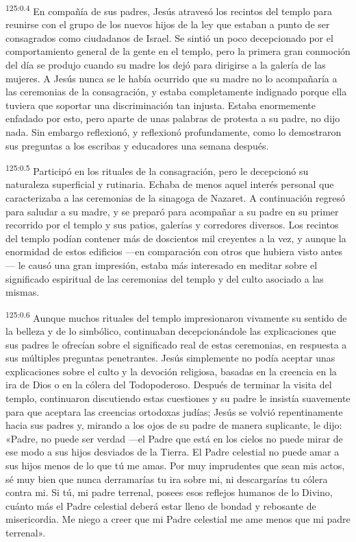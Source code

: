 \par
\textsuperscript{125:0.4} En compañía de sus padres, Jesús atravesó los recintos del templo para reunirse con el grupo de los nuevos hijos de la ley que estaban a punto de ser consagrados como ciudadanos de Israel. Se sintió un poco decepcionado por el comportamiento general de la gente en el templo, pero la primera gran conmoción del día se produjo cuando su madre los dejó para dirigirse a la galería de las mujeres. A Jesús nunca se le había ocurrido que su madre no lo acompañaría a las ceremonias de la consagración, y estaba completamente indignado porque ella tuviera que soportar una discriminación tan injusta. Estaba enormemente enfadado por esto, pero aparte de unas palabras de protesta a su padre, no dijo nada. Sin embargo reflexionó, y reflexionó profundamente, como lo demostraron sus preguntas a los escribas y educadores una semana después.

\par
\textsuperscript{125:0.5} Participó en los rituales de la consagración, pero le decepcionó su naturaleza superficial y rutinaria. Echaba de menos aquel interés personal que caracterizaba a las ceremonias de la sinagoga de Nazaret. A continuación regresó para saludar a su madre, y se preparó para acompañar a su padre en su primer recorrido por el templo y sus patios, galerías y corredores diversos. Los recintos del templo podían contener más de doscientos mil creyentes a la vez, y aunque la enormidad de estos edificios ---en comparación con otros que hubiera visto antes--- le causó una gran impresión, estaba más interesado en meditar sobre el significado espiritual de las ceremonias del templo y del culto asociado a las mismas.

\par
\textsuperscript{125:0.6} Aunque muchos rituales del templo impresionaron vivamente su sentido de la belleza y de lo simbólico, continuaban decepcionándole las explicaciones que sus padres le ofrecían sobre el significado real de estas ceremonias, en respuesta a sus múltiples preguntas penetrantes. Jesús simplemente no podía aceptar unas explicaciones sobre el culto y la devoción religiosa, basadas en la creencia en la ira de Dios o en la cólera del Todopoderoso. Después de terminar la visita del templo, continuaron discutiendo estas cuestiones y su padre le insistía suavemente para que aceptara las creencias ortodoxas judías; Jesús se volvió repentinamente hacia sus padres y, mirando a los ojos de su padre de manera suplicante, le dijo: «Padre, no puede ser verdad ---el Padre que está en los cielos no puede mirar de ese modo a sus hijos desviados de la Tierra. El Padre celestial no puede amar a sus hijos menos de lo que tú me amas. Por muy imprudentes que sean mis actos, sé muy bien que nunca derramarías tu ira sobre mi, ni descargarías tu cólera contra mi. Si tú, mi padre terrenal, posees esos reflejos humanos de lo Divino, cuánto más el Padre celestial deberá estar lleno de bondad y rebosante de misericordia. Me niego a creer que mi Padre celestial me ame menos que mi padre terrenal».

